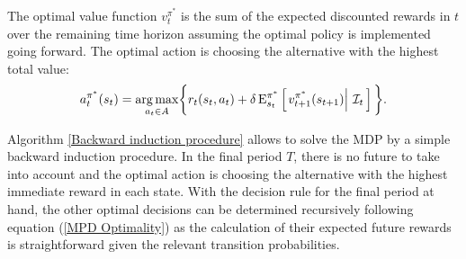 \noindent The optimal value function $v^{\pi^*}_t$ is the sum of the expected discounted rewards in $t$ over the remaining time horizon assuming the optimal policy is implemented going forward. The optimal action is choosing the alternative with the highest total value:
%
\begin{align*}
a^{\pi^*}_t(s_t) = \underset{a_t\in A}{\operatorname*{arg\,max}} \bigg\{ r_t(s_t, a_t) + \delta\,\mathrm{E}^{\pi^*}_{s_t} \left[\left.v^{\pi^*}_{t + 1}(s_{t + 1})\right\vert\,\mathcal{I}_t\,\right] \bigg\}.\\
\end{align*}

\noindent Algorithm \ref{Backward induction procedure} allows to solve the MDP by a simple backward induction procedure. In the final period $T$, there is no future to take into account and the optimal action is choosing the alternative with the highest immediate reward in each state. With the decision rule for the final period at hand, the other optimal decisions can be determined recursively following equation (\ref{MPD Optimality}) as the calculation of their expected future rewards is straightforward given the relevant transition probabilities.

\vspace{0.5cm}\FloatBarrier
